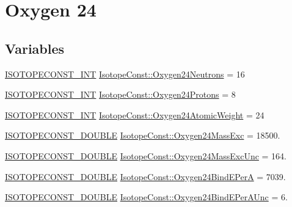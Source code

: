 \hypertarget{group___isotope_const-_oxygen-_o24}{}\section{Oxygen 24}
\label{group___isotope_const-_oxygen-_o24}
\subsection*{Variables}
\begin{DoxyCompactItemize}
\item 
\mbox{\hyperlink{group___isotope_const-_macros_ga5f18360b3e99483a35c32d789e62621c}{I\+S\+O\+T\+O\+P\+E\+C\+O\+N\+S\+T\+\_\+\+I\+NT}} \mbox{\hyperlink{group___isotope_const-_oxygen-_o24_ga526d7d71d47e2607deeae95f35150f1f}{Isotope\+Const\+::\+Oxygen24\+Neutrons}} = 16
\item 
\mbox{\hyperlink{group___isotope_const-_macros_ga5f18360b3e99483a35c32d789e62621c}{I\+S\+O\+T\+O\+P\+E\+C\+O\+N\+S\+T\+\_\+\+I\+NT}} \mbox{\hyperlink{group___isotope_const-_oxygen-_o24_ga8729ac8ef2d9df58b4a04ae450ede157}{Isotope\+Const\+::\+Oxygen24\+Protons}} = 8
\item 
\mbox{\hyperlink{group___isotope_const-_macros_ga5f18360b3e99483a35c32d789e62621c}{I\+S\+O\+T\+O\+P\+E\+C\+O\+N\+S\+T\+\_\+\+I\+NT}} \mbox{\hyperlink{group___isotope_const-_oxygen-_o24_gaaf4a2a05c1edf3a7a649468bc5f1ff1a}{Isotope\+Const\+::\+Oxygen24\+Atomic\+Weight}} = 24
\item 
\mbox{\hyperlink{group___isotope_const-_macros_ga8f45a7272ce02c0b4c65c44636ed719a}{I\+S\+O\+T\+O\+P\+E\+C\+O\+N\+S\+T\+\_\+\+D\+O\+U\+B\+LE}} \mbox{\hyperlink{group___isotope_const-_oxygen-_o24_ga52ddd9d96aecd97f48f5c93e5c426bd7}{Isotope\+Const\+::\+Oxygen24\+Mass\+Exc}} = 18500.
\item 
\mbox{\hyperlink{group___isotope_const-_macros_ga8f45a7272ce02c0b4c65c44636ed719a}{I\+S\+O\+T\+O\+P\+E\+C\+O\+N\+S\+T\+\_\+\+D\+O\+U\+B\+LE}} \mbox{\hyperlink{group___isotope_const-_oxygen-_o24_gaf3b5d540ee1d351b735d79c71ab4c789}{Isotope\+Const\+::\+Oxygen24\+Mass\+Exc\+Unc}} = 164.
\item 
\mbox{\hyperlink{group___isotope_const-_macros_ga8f45a7272ce02c0b4c65c44636ed719a}{I\+S\+O\+T\+O\+P\+E\+C\+O\+N\+S\+T\+\_\+\+D\+O\+U\+B\+LE}} \mbox{\hyperlink{group___isotope_const-_oxygen-_o24_ga58380eced931e312b5b0ffca5f643a17}{Isotope\+Const\+::\+Oxygen24\+Bind\+E\+PerA}} = 7039.
\item 
\mbox{\hyperlink{group___isotope_const-_macros_ga8f45a7272ce02c0b4c65c44636ed719a}{I\+S\+O\+T\+O\+P\+E\+C\+O\+N\+S\+T\+\_\+\+D\+O\+U\+B\+LE}} \mbox{\hyperlink{group___isotope_const-_oxygen-_o24_gaa4f589d1d3053fb692d07208bf0c2d2b}{Isotope\+Const\+::\+Oxygen24\+Bind\+E\+Per\+A\+Unc}} = 6.

\end{DoxyCompactItemize}

